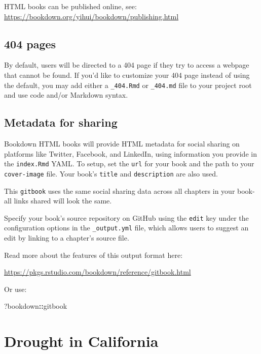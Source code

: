 \documentclass[
]{book}
\newenvironment{Shaded}{\begin{snugshade}}{\end{snugshade}}
\newcommand{\NormalTok}[1]{#1}
\newcommand{\SpecialCharTok}[1]{\textcolor[rgb]{0.81,0.36,0.00}{\textbf{#1}}}
\theoremstyle{definition}
\theoremstyle{definition}
\theoremstyle{definition}
\theoremstyle{definition}
\theoremstyle{remark}
\begin{document}
HTML books can be published online, see: \url{https://bookdown.org/yihui/bookdown/publishing.html}

\section{404 pages}\label{pages}

By default, users will be directed to a 404 page if they try to access a webpage that cannot be found. If you'd like to customize your 404 page instead of using the default, you may add either a \texttt{\_404.Rmd} or \texttt{\_404.md} file to your project root and use code and/or Markdown syntax.

\section{Metadata for sharing}\label{metadata-for-sharing}

Bookdown HTML books will provide HTML metadata for social sharing on platforms like Twitter, Facebook, and LinkedIn, using information you provide in the \texttt{index.Rmd} YAML. To setup, set the \texttt{url} for your book and the path to your \texttt{cover-image} file. Your book's \texttt{title} and \texttt{description} are also used.

This \texttt{gitbook} uses the same social sharing data across all chapters in your book- all links shared will look the same.

Specify your book's source repository on GitHub using the \texttt{edit} key under the configuration options in the \texttt{\_output.yml} file, which allows users to suggest an edit by linking to a chapter's source file.

Read more about the features of this output format here:

\url{https://pkgs.rstudio.com/bookdown/reference/gitbook.html}

Or use:

\begin{Shaded}
\begin{Highlighting}[]
\NormalTok{?bookdown}\SpecialCharTok{::}\NormalTok{gitbook}
\end{Highlighting}
\end{Shaded}

\chapter{Drought in California}\label{drought-in-california}
\end{document}
